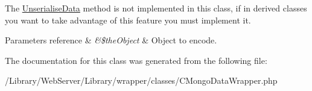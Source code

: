 The \hyperlink{class_c_mongo_data_wrapper_a581d27ffad3ff0a68c5bd6123abece01}{Unserialise\-Data} method is not implemented in this class, if in derived classes you want to take advantage of this feature you must implement it.


\begin{DoxyParams}[1]{Parameters}
reference & {\em \&\$the\-Object} & Object to encode. \\
\hline
\end{DoxyParams}


The documentation for this class was generated from the following file\-:\begin{DoxyCompactItemize}
\item 
/\-Library/\-Web\-Server/\-Library/wrapper/classes/C\-Mongo\-Data\-Wrapper.\-php\end{DoxyCompactItemize}
